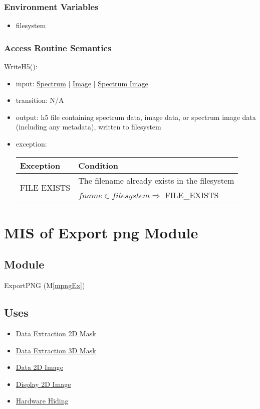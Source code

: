 \documentclass[12pt, titlepage]{article}
\newcommand{\mref}[1]{M\ref{#1}}
\begin{document}
\subsubsection{Environment Variables}
\begin{itemize}
    \item filesystem
\end{itemize}

\subsubsection{Access Routine Semantics}

\noindent WriteH5():
\begin{itemize}
    \item input: \hyperref[Mod:Spectrum]{Spectrum} $|$
    \hyperref[Mod:Image]{Image} $|$ \hyperref[Mod:SI]{Spectrum Image}
    \item transition: N/A
    \item output: h5 file containing spectrum data, image data, or spectrum
    image data (including any metadata), written to filesystem
    \item exception:
    \begin{center}
        \begin{tabular}{p{3cm} p{12cm}}
            \toprule[0.15em]
            \textbf{Exception} & \textbf{Condition}\\
            \midrule[0.1em]
            \multirow{2}{0.25\textwidth}{FILE EXISTS} & The filename already
            exists in the filesystem\\ 
            & $fname \in filesystem \Rightarrow$ FILE\_EXISTS\\ 
            \bottomrule[0.15em]
        \end{tabular}
    \end{center}
\end{itemize}


\section{MIS of Export png Module} \label{Mod:ExportPNG}

\subsection{Module}

ExportPNG (\mref{mpngEx})

\subsection{Uses}
\begin{itemize}
    \item \hyperref[Mod:Mask2D]{Data Extraction 2D Mask}
    \item \hyperref[Mod:Mask3D]{Data Extraction 3D Mask}
    \item \hyperref[Mod:Image]{Data 2D Image}
    \item \hyperref[Mod:Disp1D]{Display 2D Image}
    \item \hyperref[Mod:HH]{Hardware Hiding}
\end{itemize}
\end{document}

